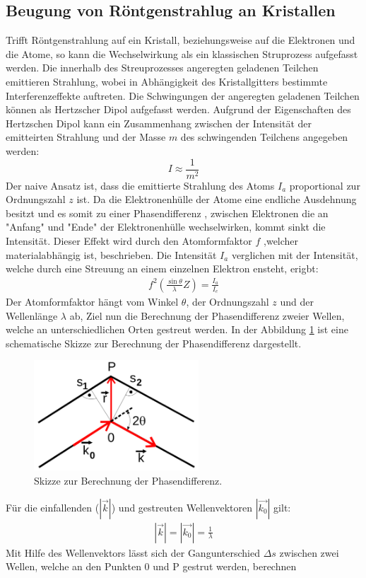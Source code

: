 \subsection{Beugung von Röntgenstrahlug an Kristallen}
Trifft Röntgenstrahlung auf ein Kristall, beziehungsweise auf die Elektronen
und die Atome, so kann die Wechselwirkung  als ein klassischen Struprozess
aufgefasst werden. Die innerhalb des Streuprozesses angeregten geladenen
Teilchen emittieren Strahlung, wobei in Abhängigkeit des Kristallgitters
bestimmte Interferenzeffekte auftreten. Die Schwingungen der angeregten
geladenen Teilchen können als Hertzscher Dipol aufgefasst werden.
Aufgrund der Eigenschaften des Hertzschen Dipol kann ein
Zusammenhang zwischen der Intensität der emitteirten Strahlung und
der Masse $m$ des schwingenden Teilchens angegeben werden:
$$I \approx \frac{1}{m^2}$$
Der naive Ansatz ist, dass die emittierte Strahlung des
Atoms $I_a$ proportional zur Ordnungszahl $z$ ist.
Da die Elektronenhülle der Atome eine endliche Ausdehnung besitzt und
es somit zu einer Phasendifferenz , zwischen Elektronen die an
"Anfang" und "Ende" der Elektronenhülle wechselwirken, kommt sinkt die
Intensität. Dieser Effekt wird durch den Atomformfaktor $f$ ,welcher
materialabhängig ist, beschrieben. Die Intensität $I_a$ verglichen mit
der Intensität, welche durch eine Streuung an einem einzelnen Elektron ensteht,
erigbt:
\begin{align}
    f^2\left( \frac{\sin \theta}{\lambda}Z \right)=\frac{I_a}{I_e}
    \label{atom}
\end{align}
Der Atomformfaktor hängt vom Winkel $\theta$, der Ordnungszahl $z$ und der
Wellenlänge $\lambda$ ab, Ziel nun die Berechnung der Phasendifferenz zweier
Wellen, welche an unterschiedlichen Orten gestreut werden.
In der Abbildung \ref{bragg} ist eine schematische Skizze zur
Berechnung der Phasendifferenz dargestellt.
\begin{figure}
    \centering
    \includegraphics[width=0.55\textwidth]{ressources/bragg.png}
    \caption{Skizze zur Berechnung der Phasendifferenz\cite{skript}.}
    \label{bragg}
\end{figure}
Für die einfallenden ($|\vec{k}|$) und gestreuten Wellenvektoren $|\vec{k_0}|$ gilt:
\begin{align}
|\vec{k}|=|\vec{k_0}|=\frac{1}{\lambda}
    \label{welle}
\end{align}
Mit Hilfe des Wellenvektors lässt sich der Gangunterschied $\Delta s$ zwischen
zwei Wellen, welche an den Punkten 0 und P gestrut werden, berechnen

